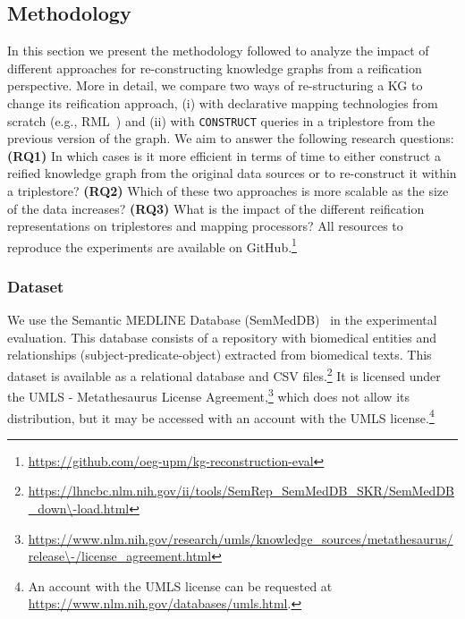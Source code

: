 \subsection{Methodology}
\label{sec:chp6-1_methodology}

In this section we present the methodology followed to analyze the impact of different approaches for re-constructing knowledge graphs from a reification perspective. More in detail, we compare two ways of re-structuring a KG to change its reification approach, (i) with declarative mapping technologies from scratch (e.g., RML~\cite{iglesias2023rml}) and (ii) with \texttt{CONSTRUCT} queries in a triplestore from the previous version of the graph. We aim to answer the following research questions: 
\textbf{(RQ1)} In which cases is it more efficient in terms of time to either construct a reified knowledge graph from the original data sources or to re-construct it within a triplestore?
\textbf{(RQ2)} Which of these two approaches is more scalable as the size of the data increases?
\textbf{(RQ3)} What is the impact of the different reification representations on triplestores and mapping processors?
All resources to reproduce the experiments are available on GitHub.\footnote{\url{https://github.com/oeg-upm/kg-reconstruction-eval}}



\subsubsection{Dataset}
\label{sec:chp6-1_dataset}


We use the Semantic MEDLINE Database (SemMedDB)~\cite{SemMedDB2012} in the experimental evaluation. This database consists of a repository with biomedical entities and relationships (subject-predicate-object) extracted from biomedical texts.
This dataset is available as a relational database and CSV files.\footnote{\url{https://lhncbc.nlm.nih.gov/ii/tools/SemRep\_SemMedDB\_SKR/SemMedDB\_down\-load.html}}
It is licensed under the UMLS - Metathesaurus License Agreement,\footnote{\url{https://www.nlm.nih.gov/research/umls/knowledge\_sources/metathesaurus/release\-/license\_agreement.html}} which does not allow its distribution, but it may be accessed with an account with the UMLS license.\footnote{An account with the UMLS license can be requested at \url{https://www.nlm.nih.gov/databases/umls.html}.}


